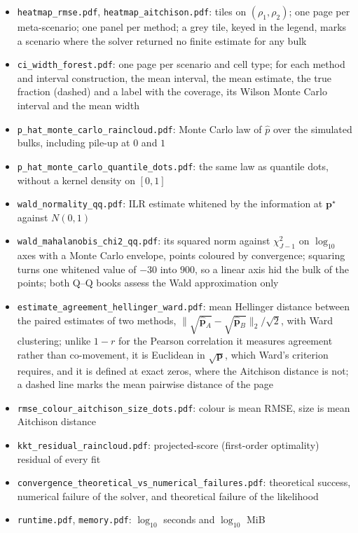 \begin{itemize}
  \item \texttt{heatmap\_rmse.pdf}, \texttt{heatmap\_aitchison.pdf}: tiles on \((\rho_{1},\rho_{2})\); one page per
        meta-scenario; one panel per method; a grey tile, keyed in the legend, marks a scenario where the solver
        returned no finite estimate for any bulk
  \item \texttt{ci\_width\_forest.pdf}: one page per scenario and cell type; for each method and interval construction,
        the mean interval, the mean estimate, the true fraction (dashed) and a label with the coverage, its Wilson
        Monte Carlo interval and the mean width \cite{morrisUsingSimulationStudies2019}
  \item \texttt{p\_hat\_monte\_carlo\_raincloud.pdf}: Monte Carlo law of \(\hat{p}\) over the simulated bulks, including
        pile-up at \(0\) and \(1\) \cite{allenRaincloudPlotsMultiplatform2019}
  \item \texttt{p\_hat\_monte\_carlo\_quantile\_dots.pdf}: the same law as quantile dots, without a kernel density on
        \([0,1]\)
  \item \texttt{wald\_normality\_qq.pdf}: ILR estimate whitened by the information at \(\boldsymbol{p}^{\star}\) against
        \(N(0,1)\)
  \item \texttt{wald\_mahalanobis\_chi2\_qq.pdf}: its squared norm against \(\chi^{2}_{J-1}\) on \(\log_{10}\) axes with a
        Monte Carlo envelope, points coloured by convergence; squaring turns one whitened value of \(-30\) into
        \(900\), so a linear axis hid the bulk of the points; both Q--Q books assess the Wald approximation only
  \item \texttt{estimate\_agreement\_hellinger\_ward.pdf}: mean Hellinger distance between the paired estimates of two
        methods, \(\lVert\sqrt{\hat{\boldsymbol{p}}_{A}}-\sqrt{\hat{\boldsymbol{p}}_{B}}\rVert_{2}/\sqrt2\), with Ward clustering;
        unlike \(1-r\) for the Pearson correlation it measures agreement rather than co-movement, it is Euclidean in
        \(\sqrt{\boldsymbol{p}}\), which Ward's criterion requires, and it is defined at exact zeros, where the Aitchison
        distance is not; a dashed line marks the mean pairwise distance of the page
  \item \texttt{rmse\_colour\_aitchison\_size\_dots.pdf}: colour is mean RMSE, size is mean Aitchison distance
  \item \texttt{kkt\_residual\_raincloud.pdf}: projected-score (first-order optimality) residual of every fit
  \item \texttt{convergence\_theoretical\_vs\_numerical\_failures.pdf}: theoretical success, numerical failure of the
        solver, and theoretical failure of the likelihood
  \item \texttt{runtime.pdf}, \texttt{memory.pdf}: \(\log_{10}\) seconds and \(\log_{10}\) MiB
\end{itemize}

